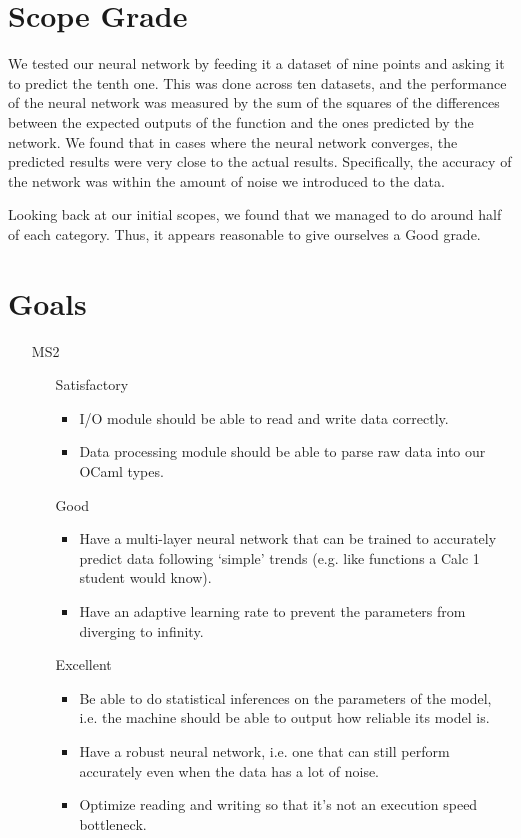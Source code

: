 \documentclass{article}
\begin{document}
\section{Scope Grade}
\label{sec:scope}

We tested our neural network by feeding it a dataset of nine points and asking it to predict the tenth one. This was done across ten datasets, and the performance of the neural network was measured by the sum of the squares of the differences between the expected outputs of the function and the ones predicted by the network. We found that in cases where the neural network converges, the predicted results were very close to the actual results. Specifically, the accuracy of the network was within the amount of noise we introduced to the data.

Looking back at our initial scopes, we found that we managed to do around half of each category. Thus, it appears reasonable to give ourselves a Good grade.

\section{Goals}
\label{sec:goals}

\begin{itemize}

\item[MS2]
	\begin{itemize}[leftmargin=2cm]
	
	\item[Satisfactory]
		\begin{itemize}
		\item I/O module should be able to read and write data correctly.
		\item Data processing module should be able to parse raw data into our OCaml types.
		\end{itemize}

	\item[Good]
		\begin{itemize}
		\item Have a multi-layer neural network that can be trained to accurately predict data following `simple' trends (e.g. like functions a Calc 1 student would know).
		\item Have an adaptive learning rate to prevent the parameters from diverging to infinity.
		\end{itemize}

	\item[Excellent]
		\begin{itemize}
		\item Be able to do statistical inferences on the parameters of the model, i.e. the machine should be able to output how reliable its model is.
		\item Have a robust neural network, i.e. one that can still perform accurately even when the data has a lot of noise.
		\item Optimize reading and writing so that it's not an execution speed bottleneck.
		\end{itemize}
	
	\end{itemize}

\end{itemize}
\end{document}
